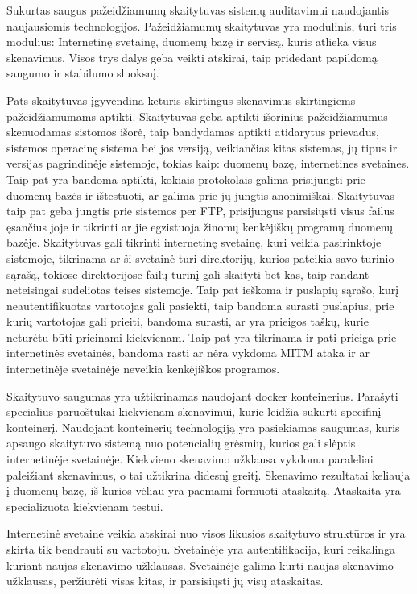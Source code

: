 \documentclass[a4paper,12pt,fleqn]{article}
\begin{document}
 
 
 Sukurtas saugus pažeidžiamumų skaitytuvas sistemų auditavimui naudojantis naujausiomis technologijos. Pažeidžiamumų skaitytuvas yra modulinis, turi tris modulius: Internetinę svetainę, duomenų bazę ir servisą, kuris atlieka visus skenavimus. Visos trys dalys geba veikti atskirai, taip pridedant papildomą saugumo ir stabilumo sluoksnį.
 
 Pats skaitytuvas įgyvendina keturis skirtingus skenavimus skirtingiems pažeidžiamumams aptikti. Skaitytuvas geba aptikti išorinius pažeidžiamumus skenuodamas sistomos išorė, taip bandydamas aptikti atidarytus prievadus, sistemos operacinę sistema bei jos versiją, veikiančias kitas sistemas, jų tipus ir versijas pagrindinėje sistemoje, tokias kaip: duomenų bazę, internetines svetaines. Taip pat yra bandoma aptikti, kokiais protokolais galima prisijungti prie duomenų bazės ir ištestuoti, ar galima prie jų jungtis anonimiškai. Skaitytuvas taip pat geba jungtis prie sistemos per FTP, prisijungus parsisiųsti visus failus ęsančius joje ir tikrinti ar jie egzistuoja žinomų kenkėjiškų programų duomenų bazėje. Skaitytuvas gali tikrinti internetinę svetainę, kuri veikia pasirinktoje sistemoje, tikrinama ar ši svetainė turi direktorijų, kurios pateikia savo turinio sąrašą, tokiose direktorijose failų turinį gali skaityti bet kas, taip randant neteisingai sudeliotas teises sistemoje. Taip pat ieškoma ir puslapių sąrašo, kurį neautentifikuotas vartotojas gali pasiekti, taip bandoma surasti puslapius, prie kurių vartotojas gali prieiti, bandoma surasti, ar yra prieigos taškų, kurie neturėtu būti prieinami kiekvienam. Taip pat yra tikrinama ir pati prieiga prie internetinės svetainės, bandoma rasti ar nėra vykdoma MITM ataka ir ar internetinėje svetainėje neveikia kenkėjiškos programos. 
 
 Skaitytuvo saugumas yra užtikrinamas naudojant docker konteinerius. Parašyti specialiūs paruoštukai kiekvienam skenavimui, kurie leidžia sukurti specifinį konteinerį. Naudojant konteinerių technologiją yra pasiekiamas saugumas, kuris apsaugo skaitytuvo sistemą nuo potencialių grėsmių, kurios gali slėptis internetinėje svetainėje. Kiekvieno skenavimo užklausa vykdoma paraleliai paleižiant skenavimus, o tai užtikrina didesnį greitį. Skenavimo rezultatai keliauja į duomenų bazę, iš kurios vėliau yra paemami formuoti ataskaitą. Ataskaita yra specializuota kiekvienam testui.
 
 Internetinė svetainė veikia atskirai nuo visos likusios skaitytuvo struktūros ir yra skirta tik bendrauti su vartotoju. Svetainėje yra autentifikacija, kuri reikalinga kuriant naujas skenavimo užklausas. Svetainėje galima kurti naujas skenavimo užklausas, peržiurėti visas kitas, ir parsisiųsti jų visų ataskaitas. 
 
\end{document}
